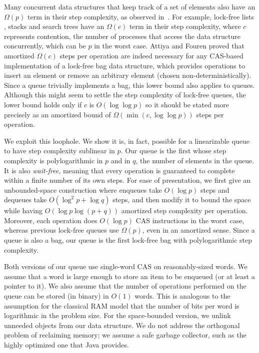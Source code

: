 Many concurrent data structures that keep track of a set of elements also have an $\Omega(p)$ term in their step complexity, as observed in~\cite{Rup16}.
For example, lock-free lists \cite{FR04,Sha15}, stacks \cite{Tre86} and search trees \cite{EFHR14} 
have an $\Omega(c)$ term in their step complexity, where $c$ represents contention,
the number of processes that access the data structure concurrently, which can be $p$ in the worst case.
Attiya and Fouren \cite{DBLP:conf/opodis/AttiyaF17} proved 
that amortized $\Omega(c)$ steps per operation are indeed necessary
for any CAS-based implementation of a lock-free bag data structure, which provides operations
to insert an element or remove an arbitrary element (chosen non-deterministically).
Since a queue trivially implements a bag, this lower bound also applies to queues.
Although this might seem to settle the step complexity of lock-free queues, the lower bound
holds only if $c$ is $O(\log\log p)$ so it should be stated more precisely as
an amortized bound of $\Omega(\min(c,\log\log p))$ steps per operation.

We exploit this loophole.  We show  it is, in fact, possible for a linearizable queue
to have step complexity sublinear in $p$.
Our queue is the first whose step complexity  is polylogarithmic in $p$ and in $q$, the number of elements in the queue.
It is also \emph{wait-free}, meaning that every operation is guaranteed to complete within a finite number of its own steps.
For ease of presentation, we first give an unbounded-space construction where enqueues take $O(\log p)$ steps and
dequeues take $O(\log^2 p + \log q)$ steps,
and then modify it to bound the space
while  having $O(\log p\log( p+ q))$ amortized step complexity  per operation.
Moreover,  each operation does $O(\log p)$ CAS instructions in the worst case, whereas previous
lock-free queues use 
$\Omega(p)$, even in an amortized sense.
Since a queue is also a bag, our queue is the first lock-free bag  with polylogarithmic step complexity.

Both versions of our queue use single-word CAS on reasonably-sized 
words.
We assume that a word is large enough to store an item to be enqueued (or at least a pointer to it).  We also assume that the number of operations performed on the queue can be stored (in binary) in $O(1)$ words.
This is analogous to the assumption for the classical RAM model that the number of bits per word is logarithmic in the problem size.
For the space-bounded version, we unlink unneeded objects from our data structure.
We do not address the orthogonal problem of reclaiming memory; we assume a safe
garbage collector, such as the highly optimized one that Java provides.


